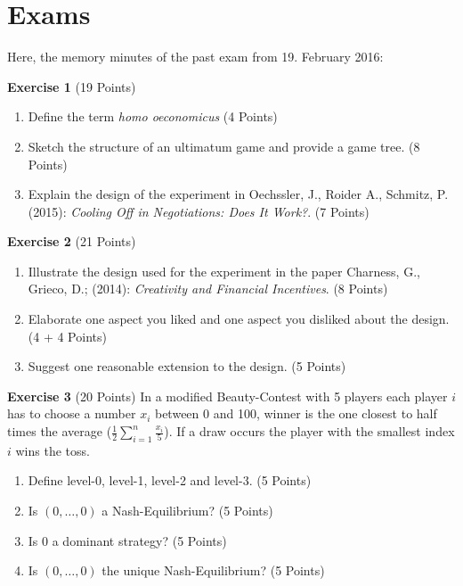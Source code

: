 \chapter*{Exams} 

Here, the memory minutes of the past exam from 19. February 2016:

\textbf{Exercise 1} (19 Points)
\begin{enumerate}[label=\alph*\upshape)]
	\item Define the term \textit{homo oeconomicus} (4 Points)
	\item Sketch the structure of an ultimatum game and provide a game tree. (8 Points)
	\item Explain the design of the experiment in Oechssler, J., Roider A., Schmitz, P. (2015): \textit{Cooling Off in Negotiations: Does It Work?}. (7 Points)
\end{enumerate}
\textbf{Exercise 2} (21 Points)
\begin{enumerate}[label=\alph*\upshape)]
	\item Illustrate the design used for the experiment in the paper Charness, G., Grieco, D.; (2014): \textit{Creativity and Financial Incentives}. (8 Points)
	\item Elaborate one aspect you liked and one aspect you disliked about the design. (4 + 4 Points)
	\item Suggest one reasonable extension to the design. (5 Points)
\end{enumerate}
\textbf{Exercise 3} (20 Points)
In a modified Beauty-Contest with 5 players each player $i$ has to choose a number $x_{i}$ between 0 and 100, winner is the one closest to half times the average ($\frac{1}{2} \sum_{i = 1}^{n} \frac{x_{i}}{5}$). If a draw occurs the player with the smallest index $i$ wins the toss.
\begin{enumerate}[label=\alph*\upshape)]
	\item Define level-0, level-1, level-2 and level-3. (5 Points)
	\item Is $(0, \dotsc, 0)$ a Nash-Equilibrium? (5 Points)
	\item Is $0$ a dominant strategy? (5 Points)
	\item Is $(0, \dotsc, 0)$ the unique Nash-Equilibrium? (5 Points)
\end{enumerate}